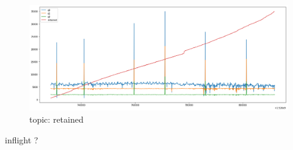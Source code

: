 \documentclass[12pt, letterpaper]{article}
\begin{document}
\begin{figure}
	\setlength{\tabcolsep}{0pt}
	\caption{topic: retained}
	\label{f:valid_cnt_retained}
	\begin{center}
		\includegraphics[width=\textwidth]{valid_cnt/valid_cnt-retained}	
	\end{center}
\end{figure}

inflight ?
\end{document}
